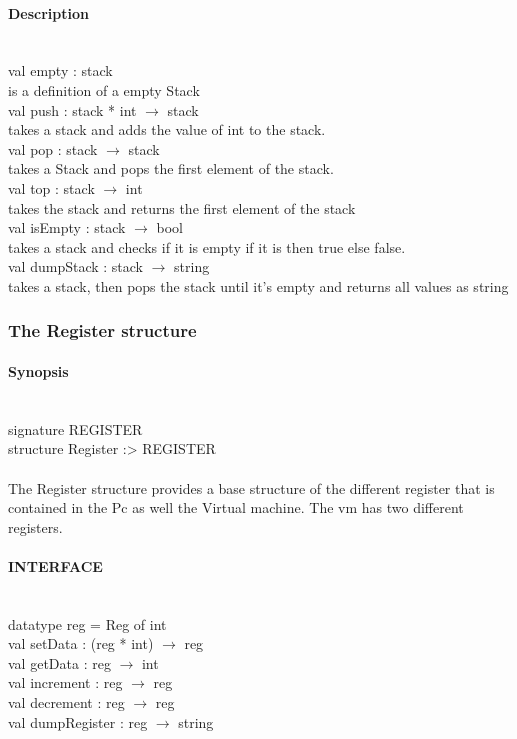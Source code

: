 \documentclass{article}
\begin{document}
\paragraph{Description}\
\\
	val empty : stack\\
		is a definition of a empty Stack
\\
	val push : stack * int $\rightarrow$ stack\\
		takes a stack and adds the value of int to the stack.
\\
	val pop : stack $\rightarrow$ stack	\\
		takes a Stack and pops the first element of the stack.
\\
	val top : stack $\rightarrow$ int\\
		takes the stack and returns the first element of the stack
\\
	val isEmpty : stack $\rightarrow$ bool\\
		takes a stack and checks if it is empty if it is then true else false.
\\
	val dumpStack : stack $\rightarrow$ string\\
		takes a stack, then pops the stack until it's empty and returns all values as string

\subsubsection{The Register structure}
\paragraph{Synopsis} \
\\
signature REGISTER\\
structure Register :> REGISTER\\
\\
The Register structure provides a base structure of the different register that
is contained in the Pc as well the Virtual machine. The vm has two different registers.\\
\paragraph{INTERFACE} \
\\
	datatype reg = Reg of int
\\
	val setData : (reg * int) $\rightarrow$ reg
\\	val getData : reg $\rightarrow$ int
\\	val increment : reg $\rightarrow$ reg
\\	val decrement : reg $\rightarrow$ reg
\\	val dumpRegister : reg $\rightarrow$ string
\end{document}

